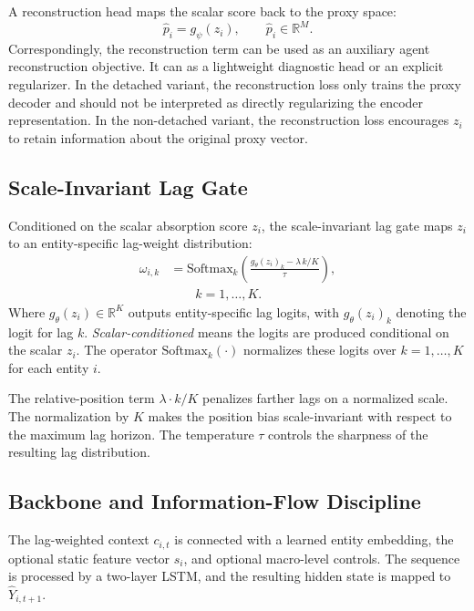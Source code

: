 \documentclass[conference]{IEEEtran}
\begin{document}
A reconstruction head maps the scalar score back to the proxy space:
\begin{equation}
    \widehat{p}_i = g_{\psi}(z_i),
    \qquad \widehat{p}_i\in\mathbb{R}^{M}.
\end{equation}
Correspondingly, the reconstruction term can be used as an auxiliary agent reconstruction objective. It can as a lightweight diagnostic head or an explicit regularizer. In the detached variant, the reconstruction loss only trains the proxy decoder and should not be interpreted as directly regularizing the encoder representation. In the non-detached variant, the reconstruction loss encourages $z_i$ to retain information about the original proxy vector.


\subsection{Scale-Invariant Lag Gate}
Conditioned on the scalar absorption score $z_i$, the scale-invariant lag gate maps $z_i$ to an entity-specific lag-weight distribution:
\begin{equation}
\begin{aligned}
\omega_{i,k}
&= \mathrm{Softmax}_{k}\!\left(
\frac{g_{\theta}(z_i)_k - \lambda\, k/K}{\tau}
\right),\\
&\qquad k=1,\ldots,K.
\end{aligned}
\end{equation}
Where $g_{\theta}(z_i)\in\mathbb{R}^{K}$ outputs entity-specific lag logits, with $g_{\theta}(z_i)_k$ denoting the logit for lag $k$. \textit{Scalar-conditioned} means the logits are produced conditional on the scalar $z_i$. The operator $\mathrm{Softmax}_k(\cdot)$ normalizes these logits over $k=1,\ldots,K$ for each entity $i$.

The relative-position term $\lambda\cdot k/K$ penalizes farther lags on a normalized scale. The normalization by $K$ makes the position bias scale-invariant with respect to the maximum lag horizon. The temperature $\tau$ controls the sharpness of the resulting lag distribution.


\subsection{Backbone and Information-Flow Discipline}
The lag-weighted context $c_{i,t}$ is connected with a learned entity embedding, the optional static feature vector $s_i$, and optional macro-level controls. The sequence is processed by a two-layer LSTM, and the resulting hidden state is mapped to $\widehat{Y}_{i,t+1}$.
\end{document}
